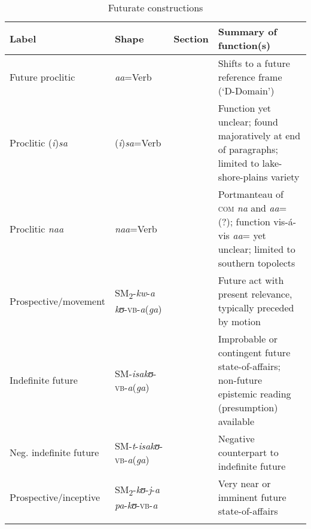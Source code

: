 \begin{sidewaystable}
	\begin{tabularx}{\textwidth}{lllX}
		\lsptoprule
		\footnotesize{Label} & \footnotesize{Shape} &\footnotesize{Section} & \footnotesize{Summary of function(s)}\\
		\midrule
		Future proclitic & \textit{aa}=Verb & \sectref{ProcliticAa} & Shifts to a future reference frame (\lq D-Domain')\\
		Proclitic (\textit{i})\textit{sa} & (\textit{i})\textit{sa}=Verb & \sectref{ProcliticIsa} & Function yet unclear; found majoratively at end of paragraphs; limited to lake-shore-plains variety\\
		Proclitic \textit{naa} & \textit{naa}=Verb & \sectref{ProcliticNaa}  & Portmanteau of \textsc{com} \textit{na} and \textit{aa}= (?); function vis-á-vis \textit{aa}= yet unclear; limited to southern topolects\\
		Prospective/movement & SM\textsubscript{2}-\textit{kw}-\textit{a} \textit{kʊ}-\textsc{vb}-\textit{a}(\textit{ga}) & \sectref{Prospectivekwa} & Future act with present relevance, typically preceded by motion\\
		Indefinite future & SM-\textit{isakʊ}-\textsc{vb}-\textit{a}(\textit{ga}) & \sectref{isaFut} &  Improbable or contingent future state-of-affairs; non-future epistemic reading (presumption) available\\
		Neg. indefinite future & SM-\textit{t}-\textit{isakʊ}-\textsc{vb}-\textit{a}(\textit{ga}) &  \sectref{isaFut} & Negative counterpart to indefinite future\\
		Prospective/inceptive & SM\textsubscript{2}-\textit{kʊ}-\textit{j}-\textit{a} \textit{pa}-\textit{kʊ}-\textsc{vb}-\textit{a} & \sectref {ProspectiveKujapa} & Very near or imminent future state-of-affairs\\
		\lspbottomrule
	\end{tabularx}	
	\caption{Futurate constructions}\label{tabAppendixFuturates}
\end{sidewaystable}	

